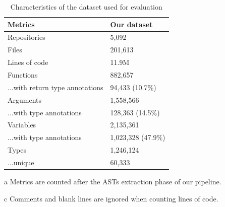 \begin{table}[!t]
	\centering
	\caption{Characteristics of the dataset used for evaluation}
	\label{ch4:tab:dataset}
	\begin{threeparttable}
		\begin{tabular}{@{}ll@{}}
			\toprule
			Metrics\tnote{a,b} & Our dataset \\
			\midrule
			Repositories & 5,092 \\
			Files & 201,613 \\
			Lines of code\tnote{c} & 11.9M \\
			\midrule
			Functions & 882,657 \\
			...with return type annotations & 94,433 (10.7\%) \\
			\midrule
			Arguments & 1,558,566 \\
			...with type annotations & 128,363 (14.5\%) \\
			\midrule
			Variables & 2,135,361 \\
			...with type annotations & 1,023,328 (47.9\%) \\
			\midrule
			Types & 1,246,124 \\
			...unique & 60,333 \\
			\bottomrule
		\end{tabular}
		\begin{tablenotes}[flushleft]
			\item[a] {\footnotesize Metrics are counted after the ASTs extraction phase of our pipeline.}
			\item[c] {\footnotesize Comments and blank lines are ignored when counting lines of code.}
		\end{tablenotes}
	\end{threeparttable}
\end{table}

